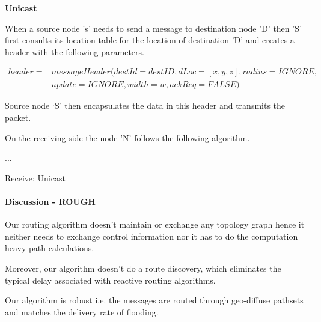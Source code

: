 \textbf{Unicast}

When a source node 's' needs to send a message to destination node 'D' then 'S' first consults its location table for the location of destination 'D' and creates a header with the following parameters.

\begin{eqnarray*}
header = & messageHeader(destId = destID, dLoc = [x,y,z], radius = IGNORE,\\
    & update = IGNORE, width = w, ackReq = FALSE)
\end{eqnarray*}

Source node `S' then encapsulates the data in this header and transmits the packet.

On the receiving side the node 'N' follows the following algorithm.

\begin{algorithm}
\SetAlgoLined
{...\;}
\caption{Receive: Unicast} \label{unicast_recv}
\end{algorithm}

\paragraph{Discussion - ROUGH}

Our routing algorithm doesn't maintain or exchange any topology graph hence it neither needs to exchange control information nor it has to do the computation heavy path calculations.

Moreover, our algorithm doesn't do a route discovery, which eliminates the typical delay associated with reactive routing algorithms. 

Our algorithm is robust i.e. the messages are routed through geo-diffuse pathsets and matches the delivery rate of flooding.